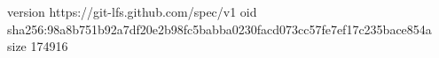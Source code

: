 version https://git-lfs.github.com/spec/v1
oid sha256:98a8b751b92a7df20e2b98fc5babba0230facd073cc57fe7ef17c235bace854a
size 174916
